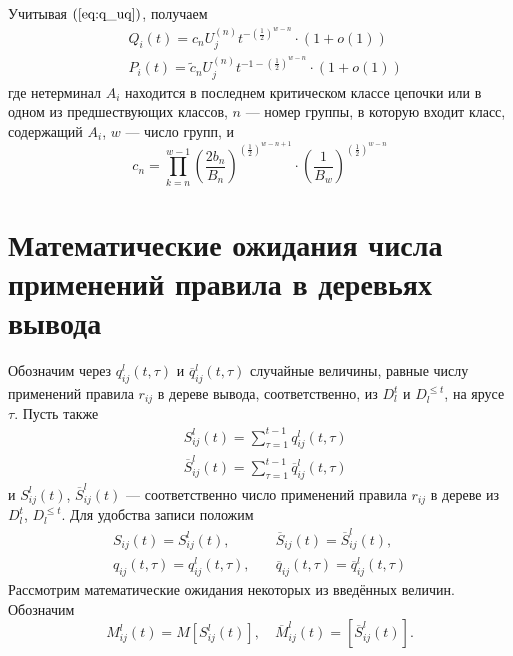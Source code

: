 \documentclass[12pt]{article}
\renewcommand{\leq}{\leqslant}
\begin{document}
Учитывая $(\ref{eq:q_uq})$, получаем
\begin{equation*}
	\begin{split}
		&Q_i(t) = c_n U^{(n)}_j t^{-\left(\frac{1}{2}\right)^{w-n}} \cdot (1 + o(1)) \\
		&P_i(t) = \tilde{c}_n U^{(n)}_j t^{-1 -\left(\frac{1}{2}\right)^{w-n}} \cdot (1 + o(1))
	\end{split}
\end{equation*}
где нетерминал $A_i$ находится в последнем критическом классе цепочки или в одном из предшествующих классов, $n$ --- номер группы, в которую входит класс, содержащий $A_i$, $w$ --- число групп, и
\begin{equation*}
	c_n = \prod_{k = n}^{w - 1} \left(\frac{2 b_n}{B_n}\right)^{\left(\frac{1}{2}\right)^{w - n + 1}} \cdot \left(\frac{1}{B_w}\right)^{\left(\frac{1}{2}\right)^{w - n}}
\end{equation*}

\section{Математические ожидания числа применений правила в деревьях вывода}

Обозначим через $q^l_{ij}(t,\tau)$ и $\overline{q}^l_{ij}(t,\tau)$ случайные величины, равные числу применений правила $r_{ij}$ в дереве вывода, соответственно, из $D^t_l$ и $D^{\leq t}_l$, на ярусе $\tau$. Пусть также
\begin{equation*}
	\begin{split}
		&S^l_{ij}(t) = \sum_{\tau = 1}^{t-1} q^l_{ij}(t, \tau) \\
		&\overline{S}^l_{ij}(t) = \sum_{\tau = 1}^{t-1} \overline{q}^l_{ij}(t, \tau)
	\end{split}
\end{equation*}
и $S^l_{ij}(t)$, $\overline{S}^l_{ij}(t)$ --- соответственно число применений правила $r_{ij}$ в дереве из $D^t_l$, $D^{\leq t}_l$. Для удобства записи положим
\begin{align*}
	S_{ij}(t) = S^l_{ij}(t),\quad &\overline{S}_{ij}(t) = \overline{S}^l_{ij}(t), \\
	q_{ij}(t, \tau) = q^l_{ij}(t, \tau),\quad &\overline{q}_{ij}(t, \tau) = \overline{q}^l_{ij}(t, \tau)
\end{align*}
Рассмотрим математические ожидания некоторых из введённых величин. Обозначим
\begin{equation*}
	M^l_{ij}(t) = M[S^l_{ij}(t)],\quad \overline{M}^l_{ij}(t) = [\overline{S}^l_{ij}(t)].
\end{equation*}
\end{document}
